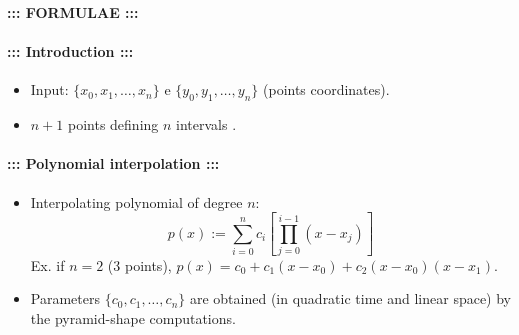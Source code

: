 \documentclass[a4paper,12pt]{amsart}
\newif\ifita
\begin{document}
\onehalfspacing
\renewcommand{\baselinestretch}{1.5} 
\clearpage\thispagestyle{empty}
\begin{center}
{\Large \bf ::: \ifita FORMULARIO \else FORMULAE \fi :::}
\end{center}
\vskip 3mm
\paragraph{\bf ::: \ifita Premessa \else Introduction \fi :::}
\begin{itemize} 
\item Input: $\{x_0,x_1,\ldots,x_n\}$ e $\{y_0,y_1,\ldots,y_n\}$ (\ifita coordinate dei punti \else points coordinates\fi).
\item $n+1$ \ifita punti che definiscono \else points defining \fi $n$ \ifita intervalli \else intervals \fi.
\end{itemize}
\vskip 3mm
\paragraph{\bf ::: \ifita Interpolazione polinomiale \else Polynomial interpolation \fi:::}
\begin{itemize} 

\item \ifita Polinomio interpolante di grado \else Interpolating polynomial of degree \fi $n$:
$$p(x):=\sum_{i=0}^n c_i \left[ \prod_{j=0}^{i-1} (x-x_j) \right]$$
\ifita Es. se $n=2$ (3 punti), \else Ex. if $n=2$ (3 points), \fi $p(x)=c_0+c_1(x-x_0)+c_2(x-x_0)(x-x_1)$.
\ifita
\item I parametri $\{c_0,c_1,\ldots,c_n\}$ si cacolano (in tempo quadratico e spazio lineare) con lo schema di calcolo a piramide.
\else
\item Parameters $\{c_0,c_1,\ldots,c_n\}$ are obtained (in quadratic time and linear space) by the pyramid-shape computations.
\fi
\end{itemize}
\end{document}
